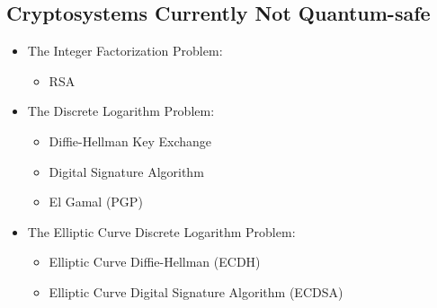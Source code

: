 \subsection{Cryptosystems Currently Not Quantum-safe }
\begin{itemize}	
	\item The Integer Factorization Problem: 
	\begin{itemize}	
		\item RSA
	\end{itemize}	
	\item The Discrete Logarithm Problem:
	\begin{itemize}	%
		\item Diffie-Hellman Key Exchange
		\item Digital Signature Algorithm
		\item El Gamal (PGP)
	\end{itemize}	
	\item The Elliptic Curve Discrete Logarithm Problem:
	\begin{itemize}	
		\item Elliptic Curve Diffie-Hellman (ECDH)
		\item Elliptic Curve Digital Signature Algorithm (ECDSA)
	\end{itemize}	
\end{itemize}	